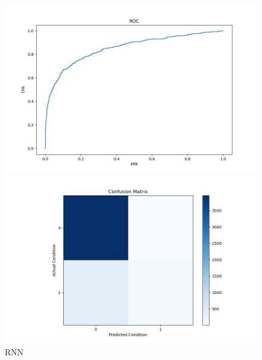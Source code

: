 \documentclass[UTF8]{article}
\begin{document}
\begin{figure}[h]
    \begin{minipage}{.48\linewidth}
        \centering
        \includegraphics[width=\linewidth]{../figure/RNN_ROC.jpg}
    \end{minipage}
    \begin{minipage}{.48    \linewidth}
        \centering
        \includegraphics[width=\linewidth]{../figure/RNN_Confusion.jpg}
    \end{minipage}
    \caption{RNN}
\end{figure}
\end{document}
